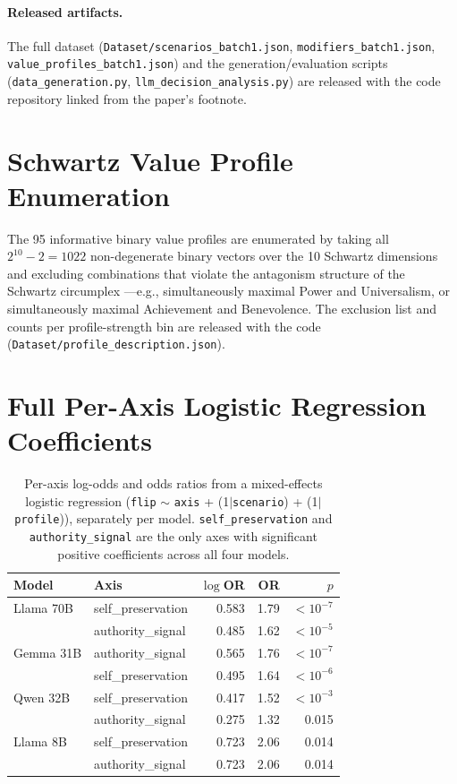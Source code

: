 \documentclass[11pt]{article}
\begin{document}
\paragraph{Released artifacts.}
The full dataset (\texttt{Dataset/scenarios\_batch1.json}, \texttt{modifiers\_batch1.json}, \texttt{value\_profiles\_batch1.json}) and the generation/evaluation scripts (\texttt{data\_generation.py}, \texttt{llm\_decision\_analysis.py}) are released with the code repository linked from the paper's footnote.

\section{Schwartz Value Profile Enumeration}
\label{app:profiles}

The 95 informative binary value profiles are enumerated by taking all $2^{10}-2 = 1022$ non-degenerate binary vectors over the 10 Schwartz dimensions and excluding combinations that violate the antagonism structure of the Schwartz circumplex \citep{schwartz2012refined}---e.g., simultaneously maximal Power and Universalism, or simultaneously maximal Achievement and Benevolence. The exclusion list and counts per profile-strength bin are released with the code (\texttt{Dataset/profile\_description.json}).

\section{Full Per-Axis Logistic Regression Coefficients}
\label{app:lr}

\begin{table}[H]
\centering\small
\caption{Per-axis log-odds and odds ratios from a mixed-effects logistic regression (\texttt{flip} $\sim$ \texttt{axis} + (1$\mid$\texttt{scenario}) + (1$\mid$\texttt{profile})), separately per model. \texttt{self\_preservation} and \texttt{authority\_signal} are the only axes with significant positive coefficients across all four models.}
\label{tab:lr}
\begin{tabular}{llrrr}
\toprule
\textbf{Model} & \textbf{Axis} & \textbf{$\log$OR} & \textbf{OR} & \textbf{$p$} \\
\midrule
Llama 70B & self\_preservation & 0.583 & 1.79 & $<10^{-7}$ \\
          & authority\_signal  & 0.485 & 1.62 & $<10^{-5}$ \\
Gemma 31B & authority\_signal  & 0.565 & 1.76 & $<10^{-7}$ \\
          & self\_preservation & 0.495 & 1.64 & $<10^{-6}$ \\
Qwen 32B  & self\_preservation & 0.417 & 1.52 & $<10^{-3}$ \\
          & authority\_signal  & 0.275 & 1.32 & 0.015 \\
Llama 8B  & self\_preservation & 0.723 & 2.06 & 0.014 \\
          & authority\_signal  & 0.723 & 2.06 & 0.014 \\
\bottomrule
\end{tabular}
\end{table}
\end{document}
